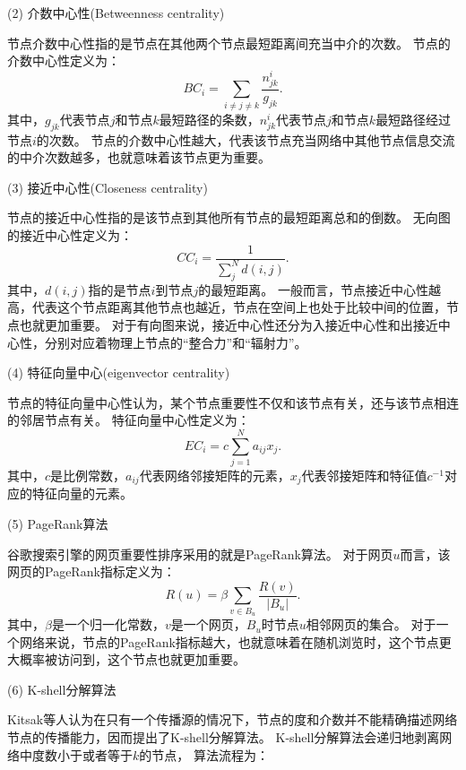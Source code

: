 (2) 介数中心性(Betweenness centrality) \cite{Newman2005}

节点介数中心性指的是节点在其他两个节点最短距离间充当中介的次数。
节点的介数中心性定义为：
\begin{equation}
BC_i = \sum_{i\neq j \neq k}\frac{n_{jk}^i}{g_{jk}}.
\end{equation}
其中，$ g_{jk} $代表节点$ j $和节点$ k $最短路径的条数，$ n_{jk}^i $代表节点$ j $和节点$ k $最短路径经过节点$ i $的次数。
节点的介数中心性越大，代表该节点充当网络中其他节点信息交流的中介次数越多，也就意味着该节点更为重要。

(3) 接近中心性(Closeness centrality) \cite{Okamoto2008}

节点的接近中心性指的是该节点到其他所有节点的最短距离总和的倒数。
无向图的接近中心性定义为：
\begin{equation}
CC_i = \frac{1}{\sum_{j}^{N}d{(i,j)}}.
\end{equation}
其中，$ d(i,j) $指的是节点$ i $到节点$ j $的最短距离。
一般而言，节点接近中心性越高，代表这个节点距离其他节点也越近，节点在空间上也处于比较中间的位置，节点也就更加重要。
对于有向图来说，接近中心性还分为入接近中心性和出接近中心性，分别对应着物理上节点的“整合力”和“辐射力”。

(4) 特征向量中心(eigenvector centrality) \cite{Perra2008}

节点的特征向量中心性认为，某个节点重要性不仅和该节点有关，还与该节点相连的邻居节点有关。
特征向量中心性定义为：
\begin{equation}
EC_i =  c\sum_{j=1}^{N}a_{ij}x_j.
\end{equation}
其中，$ c $是比例常数，$ a_{ij} $代表网络邻接矩阵的元素，$ x_j $代表邻接矩阵和特征值$ c^{-1} $对应的特征向量的元素。

(5) PageRank算法 \cite{Page1999}

谷歌搜索引擎的网页重要性排序采用的就是PageRank算法。
对于网页$ u $而言，该网页的PageRank指标定义为：
\begin{equation}
R(u) = \beta \sum_{v\in B_u}{\frac{R{(v)}}{|B_u|}}.
\end{equation}
其中，$ \beta $是一个归一化常数，$ v $是一个网页，$ B_u $时节点$ u $相邻网页的集合。
对于一个网络来说，节点的PageRank指标越大，也就意味着在随机浏览时，这个节点更大概率被访问到，这个节点也就更加重要。

(6) K-shell分解算法 \cite{Ma1991}

Kitsak等人认为在只有一个传播源的情况下，节点的度和介数并不能精确描述网络节点的传播能力，因而提出了K-shell分解算法。
K-shell分解算法会递归地剥离网络中度数小于或者等于$ k $的节点，
算法流程为：

